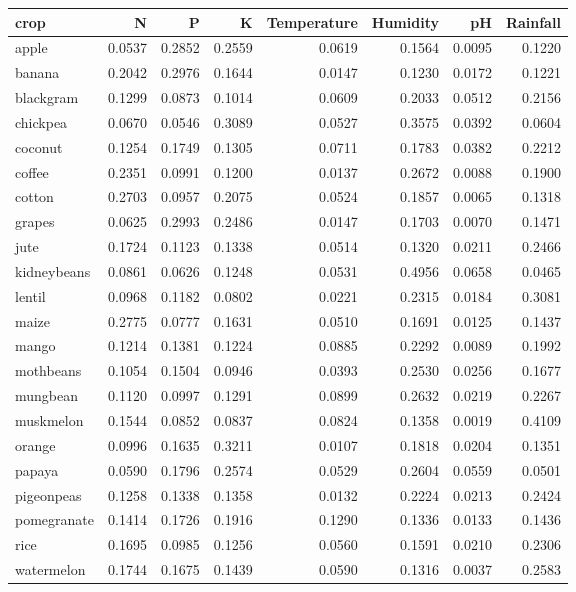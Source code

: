 \begin{tabular}{lrrrrrrr}
\toprule
crop & N & P & K & Temperature & Humidity & pH & Rainfall \\
\midrule
apple & 0.0537 & 0.2852 & 0.2559 & 0.0619 & 0.1564 & 0.0095 & 0.1220 \\
banana & 0.2042 & 0.2976 & 0.1644 & 0.0147 & 0.1230 & 0.0172 & 0.1221 \\
blackgram & 0.1299 & 0.0873 & 0.1014 & 0.0609 & 0.2033 & 0.0512 & 0.2156 \\
chickpea & 0.0670 & 0.0546 & 0.3089 & 0.0527 & 0.3575 & 0.0392 & 0.0604 \\
coconut & 0.1254 & 0.1749 & 0.1305 & 0.0711 & 0.1783 & 0.0382 & 0.2212 \\
coffee & 0.2351 & 0.0991 & 0.1200 & 0.0137 & 0.2672 & 0.0088 & 0.1900 \\
cotton & 0.2703 & 0.0957 & 0.2075 & 0.0524 & 0.1857 & 0.0065 & 0.1318 \\
grapes & 0.0625 & 0.2993 & 0.2486 & 0.0147 & 0.1703 & 0.0070 & 0.1471 \\
jute & 0.1724 & 0.1123 & 0.1338 & 0.0514 & 0.1320 & 0.0211 & 0.2466 \\
kidneybeans & 0.0861 & 0.0626 & 0.1248 & 0.0531 & 0.4956 & 0.0658 & 0.0465 \\
lentil & 0.0968 & 0.1182 & 0.0802 & 0.0221 & 0.2315 & 0.0184 & 0.3081 \\
maize & 0.2775 & 0.0777 & 0.1631 & 0.0510 & 0.1691 & 0.0125 & 0.1437 \\
mango & 0.1214 & 0.1381 & 0.1224 & 0.0885 & 0.2292 & 0.0089 & 0.1992 \\
mothbeans & 0.1054 & 0.1504 & 0.0946 & 0.0393 & 0.2530 & 0.0256 & 0.1677 \\
mungbean & 0.1120 & 0.0997 & 0.1291 & 0.0899 & 0.2632 & 0.0219 & 0.2267 \\
muskmelon & 0.1544 & 0.0852 & 0.0837 & 0.0824 & 0.1358 & 0.0019 & 0.4109 \\
orange & 0.0996 & 0.1635 & 0.3211 & 0.0107 & 0.1818 & 0.0204 & 0.1351 \\
papaya & 0.0590 & 0.1796 & 0.2574 & 0.0529 & 0.2604 & 0.0559 & 0.0501 \\
pigeonpeas & 0.1258 & 0.1338 & 0.1358 & 0.0132 & 0.2224 & 0.0213 & 0.2424 \\
pomegranate & 0.1414 & 0.1726 & 0.1916 & 0.1290 & 0.1336 & 0.0133 & 0.1436 \\
rice & 0.1695 & 0.0985 & 0.1256 & 0.0560 & 0.1591 & 0.0210 & 0.2306 \\
watermelon & 0.1744 & 0.1675 & 0.1439 & 0.0590 & 0.1316 & 0.0037 & 0.2583 \\
\bottomrule
\end{tabular}
